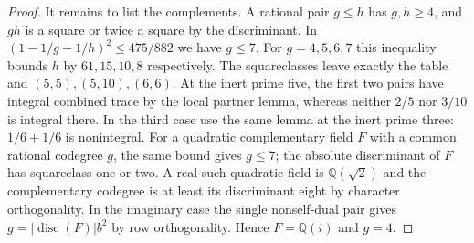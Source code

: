 \documentclass[11pt,reqno]{amsart}
\theoremstyle{remark}\newtheorem{remark}[theorem]{Remark}
\numberwithin{equation}{section}
\begin{document}
\begin{proof}
It remains to list the complements. A rational pair $g\le h$
has $g,h\ge4$, and $gh$ is a square or twice a square by
the discriminant. In
$(1-1/g-1/h)^2\le475/882$ we have $g\le7$.
For $g=4,5,6,7$ this inequality bounds $h$ by $61,15,10,8$
respectively. The squareclasses leave exactly the table
and $(5,5),(5,10),(6,6)$. At the inert prime five, the first two
pairs have integral combined trace by the local partner lemma, whereas
neither $2/5$ nor $3/10$ is integral there. In the third case use the
same lemma at the inert prime three: $1/6+1/6$ is nonintegral.
For a quadratic complementary field $F$ with a common rational
codegree $g$, the same bound gives $g\le7$; the absolute
discriminant of $F$ has squareclass one or two. A real such
quadratic field is $\mathbb Q(\sqrt2)$ and the complementary
codegree is at least its discriminant eight by character
orthogonality. In the imaginary case the single nonself-dual
pair gives $g=|\operatorname{disc}(F)|b^2$ by row orthogonality.
Hence $F=\mathbb Q(i)$ and $g=4$.
\end{proof}
\end{document}
